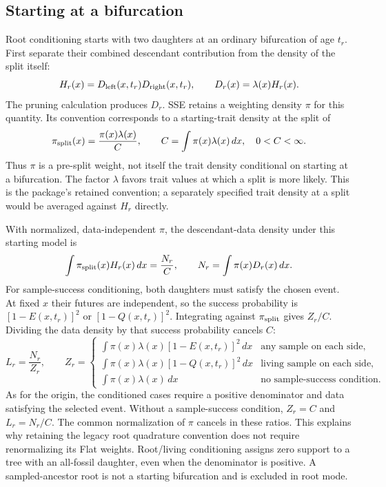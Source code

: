 \documentclass[11pt]{article}
\begin{document}
\subsection{Starting at a bifurcation}
Root conditioning starts with two daughters at an ordinary bifurcation of age $t_r$.
First separate their combined descendant contribution from the density of the split itself:
\[
 H_r(x)=D_{\rm left}(x,t_r)D_{\rm right}(x,t_r),\qquad
 D_r(x)=\lambda(x)H_r(x).
\]
The pruning calculation produces $D_r$. SSE retains a weighting density $\pi$ for this
quantity. Its convention corresponds to a starting-trait density at the split of
\[
 \pi_{\rm split}(x)=\frac{\pi(x)\lambda(x)}{C},
 \qquad C=\int\pi(x)\lambda(x)\,dx,\quad 0<C<\infty.
\]
Thus $\pi$ is a pre-split weight, not itself the trait density conditional on starting at a
bifurcation. The factor $\lambda$ favors trait values at which a split is more likely.
This is the package's retained convention; a separately specified trait density at a split
would be averaged against $H_r$ directly.

With normalized, data-independent $\pi$, the descendant-data density under this starting model is
\[
 \int\pi_{\rm split}(x)H_r(x)\,dx=\frac{N_r}{C},
 \qquad N_r=\int\pi(x)D_r(x)\,dx.
\]
For sample-success conditioning, both daughters must satisfy the chosen event. At fixed $x$
their futures are independent, so the success probability is $[1-E(x,t_r)]^2$ or
$[1-Q(x,t_r)]^2$. Integrating against $\pi_{\rm split}$ gives $Z_r/C$.
Dividing the data density by that success probability cancels $C$:
\begin{equation}\label{eq:root-condition}
 L_r=\frac{N_r}{Z_r},\qquad
 Z_r=\begin{cases}
 \int\pi(x)\lambda(x)[1-E(x,t_r)]^2\,dx & \text{any sample on each side},\\
 \int\pi(x)\lambda(x)[1-Q(x,t_r)]^2\,dx & \text{living sample on each side},\\
 \int\pi(x)\lambda(x)\,dx & \text{no sample-success condition}.
 \end{cases}
\end{equation}
As for the origin, the conditioned cases require a positive denominator and data satisfying
the selected event. Without a sample-success condition, $Z_r=C$ and $L_r=N_r/C$.
The common normalization of $\pi$ cancels in these ratios. This explains why retaining the legacy
root quadrature convention does not require renormalizing its Flat weights. Root/living conditioning
assigns zero support to a tree with an all-fossil daughter, even when the denominator is positive.
A sampled-ancestor root is not a starting bifurcation and is excluded in root mode.
\end{document}

